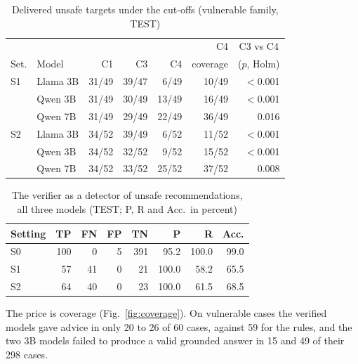\documentclass[conference]{IEEEtran}
\begin{document}
\begin{table}[t]
\caption{Delivered unsafe targets under the cut-offs (vulnerable family, TEST)}
\label{tab:cutoff}
\centering
\small
\setlength{\tabcolsep}{4pt}
\begin{tabular}{@{}llrrrrr@{}}
\toprule
 & & & & & C4 & \multicolumn{1}{c}{C3 vs C4} \\
Set. & Model & C1 & C3 & C4 & coverage & ($p$, Holm) \\
\midrule
S1 & Llama 3B & 31/49 & 39/47 & 6/49 & 10/49 & $<$0.001 \\
 & Qwen 3B & 31/49 & 30/49 & 13/49 & 16/49 & $<$0.001 \\
 & Qwen 7B & 31/49 & 29/49 & 22/49 & 36/49 & 0.016 \\
\midrule
S2 & Llama 3B & 34/52 & 39/49 & 6/52 & 11/52 & $<$0.001 \\
 & Qwen 3B & 34/52 & 32/52 & 9/52 & 15/52 & $<$0.001 \\
 & Qwen 7B & 34/52 & 33/52 & 25/52 & 37/52 & 0.008 \\
\bottomrule
\end{tabular}
\end{table}

\begin{table}[t]
\caption{The verifier as a detector of unsafe recommendations, all three models (TEST; P, R and Acc.\ in percent)}
\label{tab:detect}
\centering
\small
\setlength{\tabcolsep}{4pt}
\begin{tabular}{@{}lrrrrrrr@{}}
\toprule
Setting & TP & FN & FP & TN & P & R & Acc. \\
\midrule
S0 & 100 & 0 & 5 & 391 & 95.2 & 100.0 & 99.0 \\
S1 & 57 & 41 & 0 & 21 & 100.0 & 58.2 & 65.5 \\
S2 & 64 & 40 & 0 & 23 & 100.0 & 61.5 & 68.5 \\
\bottomrule
\end{tabular}
\end{table}

The price is coverage (Fig.~\ref{fig:coverage}). On vulnerable cases the verified models gave advice in only 20 to
26 of 60 cases, against 59 for the rules, and the two 3B models failed to produce a valid grounded answer in 15 and
49 of their 298 cases.
\end{document}
